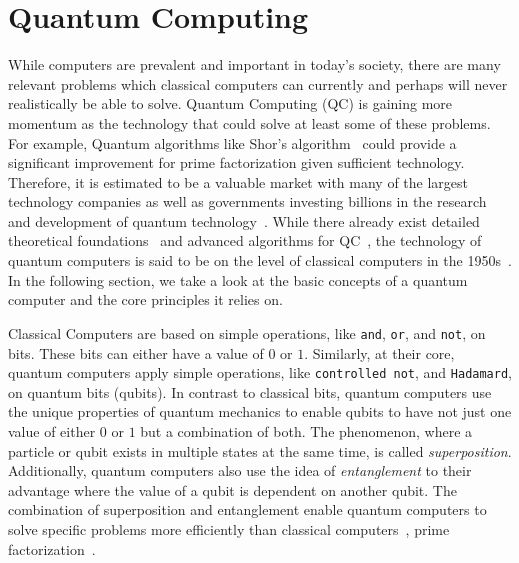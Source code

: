 \newpage
\section{Quantum Computing}
\label{sec:background_quantumComputing}
While computers are prevalent and important in today's society, there are many relevant problems which classical computers can currently and perhaps will never realistically be able to solve. Quantum Computing (QC) is gaining more momentum as the technology that could solve at least some of these problems. For example, Quantum algorithms like Shor's algorithm~\cite{Shor97} could provide a significant improvement for prime factorization given sufficient technology. Therefore, it is estimated to be a valuable market with many of the largest technology companies as well as governments investing billions in the research and development of quantum technology~\cite{RDB*22, Pres18}. While there already exist detailed theoretical foundations~\cite{van20, Ying11,YYF12} and advanced algorithms for QC~\cite{ACR*10,BGB*18,LoCh19,Shor97}, the technology of quantum computers is said to be on the level of classical computers in the 1950s~\cite{CFM17}. In the following section, we take a look at the basic concepts of a quantum computer and the core principles it relies on.

Classical Computers are based on simple operations, like \texttt{and}, \texttt{or}, and \texttt{not}, on bits. These bits can either have a value of $0$ or $1$. Similarly, at their core, quantum computers apply simple operations, like \texttt{controlled not}, and \texttt{Hadamard}, on quantum bits (qubits). In contrast to classical bits, quantum computers use the unique properties of quantum mechanics to enable qubits to have not just one value of either $0$ or $1$ but a combination of both. The phenomenon, where a particle or qubit exists in multiple states at the same time, is called \emph{superposition}. Additionally, quantum computers also use the idea of \emph{entanglement} to their advantage where the value of a qubit is dependent on another qubit. The combination of superposition and entanglement enable quantum computers to solve specific problems more efficiently than classical computers~\cite{RDB*22}, \eg prime factorization~\cite{Shor97}.

